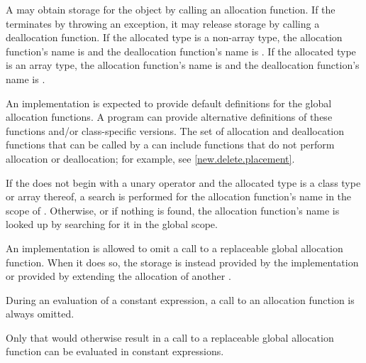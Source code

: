 \pnum
A  may obtain storage for the object by calling an
allocation function. If
the  terminates by throwing an exception, it
may release storage by calling a deallocation
function. If the allocated type
is a non-array type, the allocation function's name is
%
%
 and the deallocation function's name is
. If the allocated type is an array type, the
allocation function's name is
%
%
and the deallocation function's name is
.
\begin{note}
An implementation is expected to provide default definitions for the global
allocation
functions.
A \Cpp{} program can provide alternative definitions of
these functions and/or class-specific
versions.
The set of allocation and deallocation functions that can be called
by a 
can include functions that do not perform allocation or deallocation;
for example, see \ref{new.delete.placement}.
\end{note}

\pnum
{}%
If the 
does not begin with a unary \tcode{::} operator and
the allocated type is a class type  or array thereof,
a search is performed for the allocation function's name in the scope
of .
Otherwise, or if nothing is found,
the allocation function's name is looked up by
searching for it in the global scope.

\pnum
An implementation is allowed to omit a call to a replaceable global allocation
function. When it does so,
the storage is instead provided by the implementation or provided by extending
the allocation of another .

\pnum
During an evaluation of a constant expression,
a call to an allocation function is always omitted.
\begin{note}
Only  that would otherwise result in
a call to a replaceable global allocation function
can be evaluated in constant expressions.
\end{note}


